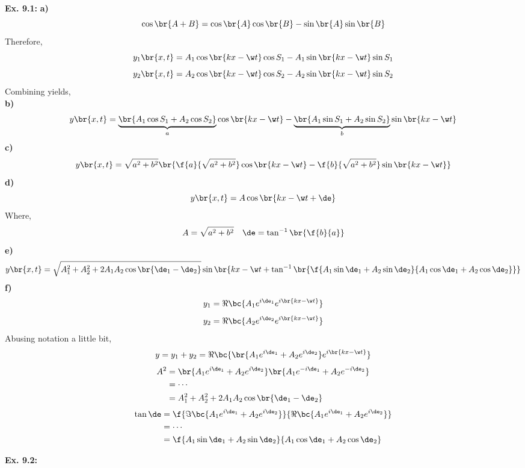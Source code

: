 \documentclass{article}
\begin{document}
\textbf{Ex. 9.1:}
\textbf{a)}
\[ \cos \br{A + B} = \cos \br{A} \cos \br{B} - \sin \br{A} \sin \br{B} \]
Therefore,
\[ y_1\br{x,t} = A_1 \cos\br{kx - \w t} \cos S_1 - A_1 \sin\br{kx - \w t} \sin S_1 \]
\[ y_2\br{x,t} = A_2 \cos\br{kx - \w t} \cos S_2 - A_2 \sin\br{kx - \w t} \sin S_2 \]
Combining yields, \\
\textbf{b)}
\[ y\br{x,t} = \underbrace{\br{A_1 \cos S_1 + A_2 \cos S_2}}_{a}\cos\br{k x - \w t} - \underbrace{\br{A_1 \sin S_1 + A_2 \sin S_2}}_{b}\sin\br{k x - \w t} \]
\textbf{c)}
\[ y\br{x,t} = \sqrt{a^2 + b^2} \br{\f{a}{\sqrt{a^2 + b^2}} \cos \br{kx - \w t} - \f{b}{\sqrt{a^2 + b^2}} \sin \br{kx - \w t}} \]
\textbf{d)}
\[ y\br{x,t} = A \cos \br{kx - \w t + \de} \]
Where,
\[ A = \sqrt{a^2 + b^2} \quad \de = \tan^{-1}\br{\f{b}{a}} \]
\textbf{e)}
\[ y\br{x,t} = \sqrt{A_1^2 + A_2^2 + 2 A_1 A_2 \cos \br{\de_1 - \de_2}}\sin\br{kx - \w t + \tan^{-1}\br{\f{A_1 \sin \de_1 + A_2 \sin \de_2}{A_1 \cos \de_1 + A_2 \cos \de_2}}} \]
\textbf{f)}
\[ y_1 = \Re \bc{A_1 e^{i \de_1} e^{i \br{kx - \w t}}} \]
\[ y_2 = \Re \bc{A_2 e^{i \de_2} e^{i \br{kx - \w t}}} \]
Abusing notation a little bit,
\[ y = y_1 + y_2 = \Re\bc{\br{A_1 e^{i\de_1} + A_2 e^{i\de_2}} e^{i \br{kx - \w t}}} \]
\begin{align*}
A^2
&= \br{A_1 e^{i \de_1} + A_2 e^{i \de_2}}\br{A_1 e^{-i \de_1} + A_2 e^{-i \de_2}} \\
&= \cdots \\
&= A_1^2 + A_2^2 + 2 A_1A_2 \cos \br{\de_1 - \de_2}
\end{align*}
\begin{align*}
\tan \de
&= \f{\Im\bc{A_1 e^{i \de_1} + A_2 e^{i \de_2}}}{\Re\bc{A_1 e^{i \de_1} + A_2 e^{i \de_2}}} \\
&= \cdots \\
&= \f{A_1 \sin \de_1 + A_2 \sin \de_2}{A_1 \cos \de_1 + A_2 \cos \de_2}
\end{align*}

\textbf{Ex. 9.2:}
\begin{center}
\end{center}
\end{document}
